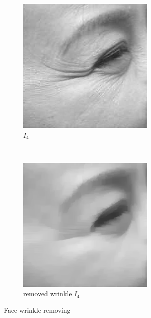 \documentclass{article}
\begin{document}
\begin{figure}[!htb]
    \centering
    \begin{subfigure}[b]{0.3\textwidth}
        \includegraphics[width=\textwidth]{img/I4.png}
        \caption{$I_4$}
    \end{subfigure}
    ~
    \begin{subfigure}[b]{0.3\textwidth}
        \includegraphics[width=\textwidth]{img/face.png}
        \caption{removed wrinkle $I_4$}
    \end{subfigure}
    \caption{Face wrinkle removing}
    \label{Face wrinkle removing}
\end{figure}
\end{document}
